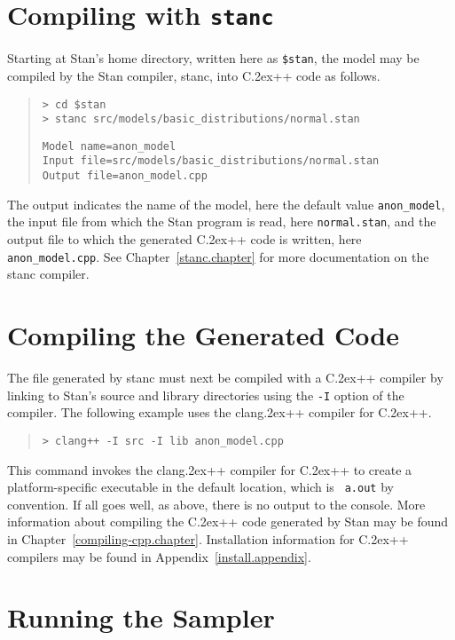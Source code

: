 \documentclass[10pt]{report}
\newcommand{\Stan}{Stan\xspace}
\newcommand{\stanc}{{\ttfamily stanc}\xspace}
\newcommand*{\Cpp}{C\raise.2ex\hbox{\footnotesize ++}\xspace} %
\newcommand{\clang}{{\ttfamily clang\raise.2ex\hbox{\footnotesize ++}}\xspace}
\newcommand{\code}[1]{{\tt #1}}
\newcommand{\refappendix}[1]{Appendix~\ref{#1.appendix}}
\newcommand{\refchapter}[1]{Chapter~\ref{#1.chapter}}
\begin{document}
\section{Compiling  with {\tt\bfseries stanc}}

Starting at Stan's home directory, written here as {\tt \$stan},
the model may be compiled by the Stan compiler, \stanc, into \Cpp code
as follows.
%
\begin{quote}
\begin{Verbatim}[fontshape=sl]
> cd $stan
> stanc src/models/basic_distributions/normal.stan
\end{Verbatim}
%
\begin{Verbatim}
Model name=anon_model
Input file=src/models/basic_distributions/normal.stan
Output file=anon_model.cpp
\end{Verbatim}
\end{quote}
%
The output indicates the name of the model, here the default value
\code{anon\_model}, the input file from which the Stan program is
read, here \code{normal.stan}, and the output file to which the
generated \Cpp code is written, here \code{anon\_model.cpp}.  See
\refchapter{stanc} for more documentation on the \stanc compiler.

\section{Compiling the Generated Code}

The file generated by \stanc must next be compiled with a \Cpp
compiler by linking to \Stan's source and library directories using
the {\tt -I} option of the compiler.  The following example 
uses the \clang compiler for \Cpp.
%
\begin{quote}
\begin{Verbatim}[fontshape=sl]
> clang++ -I src -I lib anon_model.cpp 
\end{Verbatim}
\end{quote}
%
This command invokes the \clang compiler for \Cpp to create a
platform-specific executable in the default location, which is {\tt
  a.out} by convention.  If all goes well, as above, there is no
output to the console.  More information about compiling the \Cpp code
generated by Stan may be found in \refchapter{compiling-cpp}.
Installation information for \Cpp compilers may be found in
\refappendix{install}.

\section{Running the Sampler}
\end{document}
